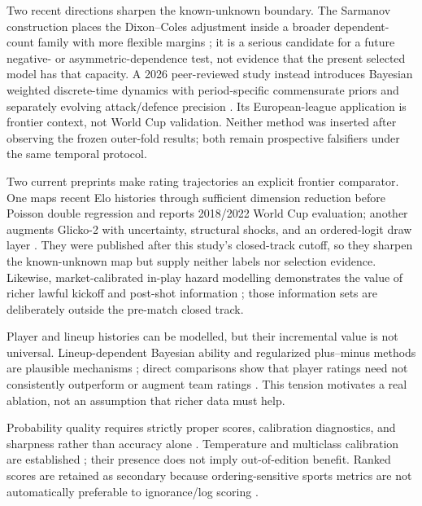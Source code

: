 \documentclass[11pt]{article}
\begin{document}
Two recent directions sharpen the known-unknown boundary.  The Sarmanov construction places the
Dixon--Coles adjustment inside a broader dependent-count family with more flexible margins
\citep{michels2025}; it is a serious candidate for a future negative- or asymmetric-dependence test,
not evidence that the present selected model has that capacity.  A 2026 peer-reviewed study instead introduces
Bayesian weighted discrete-time dynamics with period-specific commensurate priors and separately
evolving attack/defence precision \citep{macridemartino2026}.  Its European-league application is
frontier context, not World Cup validation.  Neither method was inserted after observing the frozen
outer-fold results; both remain prospective falsifiers under the same temporal protocol.

Two current preprints make rating trajectories an explicit frontier comparator.  One maps recent
Elo histories through sufficient dimension reduction before Poisson double regression and reports
2018/2022 World Cup evaluation; another augments Glicko-2 with uncertainty, structural shocks, and
an ordered-logit draw layer \citep{rezaei2026sdr,nguyen2026glicko}.  They were published after this
study's closed-track cutoff, so they sharpen the known-unknown map but supply neither labels nor
selection evidence.  Likewise, market-calibrated in-play hazard modelling demonstrates the value
of richer lawful kickoff and post-shot information \citep{clegg2026aft}; those information sets are
deliberately outside the pre-match closed track.

Player and lineup histories can be modelled, but their incremental value is not universal.
Lineup-dependent Bayesian ability and regularized plus--minus methods are plausible mechanisms
\citep{whitaker2021,kharrat2020}; direct comparisons show that player ratings need not consistently
outperform or augment team ratings \citep{arntzenhvattum2021}.  This tension motivates a real
ablation, not an assumption that richer data must help.

Probability quality requires strictly proper scores, calibration diagnostics, and sharpness rather
than accuracy alone \citep{brier1950,murphy1973,gneitingraftery2007,gneitingetal2007}.  Temperature
and multiclass calibration are established \citep{guo2017,kull2019}; their presence does not imply
out-of-edition benefit.  Ranked scores are retained as secondary because ordering-sensitive sports
metrics are not automatically preferable to ignorance/log scoring \citep{wheatcroft2021}.
\end{document}
